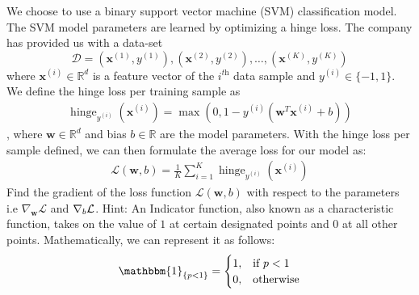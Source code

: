 \documentclass{article}
\newcommand{\R}{\mathbb{R}}
\newcommand{\x}{\bf{x}}
\newcommand{\w}{\bf{w}}
\DeclareMathOperator{\hinge}{hinge}
\renewcommand{\it}[1]{\textit{{#1}}}
\renewcommand{\bf}[1]{\textbf{{#1}}}
\begin{document}
\begin{enumerate}
            We choose to use a binary support vector machine (SVM) classification model. The SVM
            model parameters are learned by optimizing a hinge loss. The company has provided us with
            a data-set
            \[\mathcal{D} = {(\x^{(1)}, y^{(1)}), (\x^{(2)}, y^{(2)}), \ldots, (\x^{(K)}, y^{(K)})}\]
            where $\x^{(i)} \in \R^d$ is a feature vector of the $i^{\it{th}}$ data sample and 
            $y^{(i)} \in \{-1, 1\}$. We define the hinge loss per training sample as
            \begin{align}
                \hinge_{y^{(i)}} (\x^{(i)}) = \max \left( 0, 1 - y^{(i)} (\w^T \x^{(i)} + b) \right)
            \end{align}
            , where $\w \in \R^d$ and bias $b \in \R$ are the model parameters. With the hinge loss
            per sample defined, we can then formulate the average loss for our model as:
            \begin{align}
                \mathcal{L} (\w, b) = \frac{1}{K} \sum^{K}_{i = 1} \hinge_{y^{(i)}} (\x^{(i)})
            \end{align}
        Find the gradient of the loss function $\mathcal{L} (\w, b)$ with respect to the parameters
        i.e $\nabla_{\w} \mathcal{L}$ and $\nabla_b \cal{L}$.
        \newline
        Hint: An Indicator function, also known as a characteristic function, takes on the value of
        $1$ at certain designated points and $0$ at all other points. Mathematically, we can represent
        it as follows:
        \begin{align}
            \mathbbm{1}_{\{p < 1\}} = \begin{cases} 1, & \text{if } p < 1 \\ 0, & \text{otherwise} \end{cases}
        \end{align}


\end{enumerate}
\end{document}
